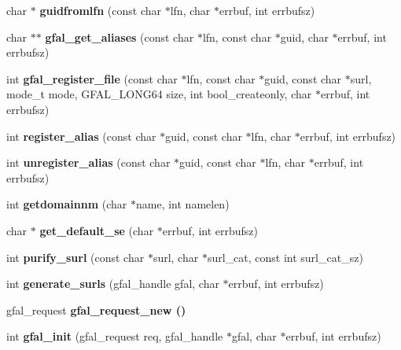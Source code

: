 \begin{CompactItemize}
\item 
char $\ast$ \textbf{guidfromlfn} (const char $\ast$lfn, char $\ast$errbuf, int errbufsz)\label{gfal__common_8c_fffd314fbaeab0aff9beb7c5b47ab13d}

\item 
char $\ast$$\ast$ \textbf{gfal\_\-get\_\-aliases} (const char $\ast$lfn, const char $\ast$guid, char $\ast$errbuf, int errbufsz)\label{group__internal__group_g25d4ae6bef6570590efbc8548e7d79e2}

\item 
int \textbf{gfal\_\-register\_\-file} (const char $\ast$lfn, const char $\ast$guid, const char $\ast$surl, mode\_\-t mode, GFAL\_\-LONG64 size, int bool\_\-createonly, char $\ast$errbuf, int errbufsz)\label{group__internal__group_gdb09f20d086253b45c5d2896be95b4a9}

\item 
int \textbf{register\_\-alias} (const char $\ast$guid, const char $\ast$lfn, char $\ast$errbuf, int errbufsz)\label{gfal__common_8c_4bb13064562b552627698601dda010cd}

\item 
int \textbf{unregister\_\-alias} (const char $\ast$guid, const char $\ast$lfn, char $\ast$errbuf, int errbufsz)\label{gfal__common_8c_8877542e026eef3292c7f5ab44c55124}

\item 
int \textbf{getdomainnm} (char $\ast$name, int namelen)\label{gfal__common_8c_446a829e4f333d3a0364ab0f2b5a2dc7}

\item 
char $\ast$ \textbf{get\_\-default\_\-se} (char $\ast$errbuf, int errbufsz)\label{gfal__common_8c_806f5f7bc913922610d15e88a78b7294}

\item 
int \textbf{purify\_\-surl} (const char $\ast$surl, char $\ast$surl\_\-cat, const int surl\_\-cat\_\-sz)\label{gfal__common_8c_b082f9f86bdeee9d7d01f1e2cf9c7c58}

\item 
int \textbf{generate\_\-surls} (gfal\_\-handle gfal, char $\ast$errbuf, int errbufsz)\label{gfal__common_8c_b2ab5186548d0aa6b5f9471b0ccb2c1e}

\item 
gfal\_\-request \bf{gfal\_\-request\_\-new} ()
\item 
int \textbf{gfal\_\-init} (gfal\_\-request req, gfal\_\-handle $\ast$gfal, char $\ast$errbuf, int errbufsz)\label{gfal__common_8c_6aed69bb7e332471c482de3372f864a7}


\end{CompactItemize}
